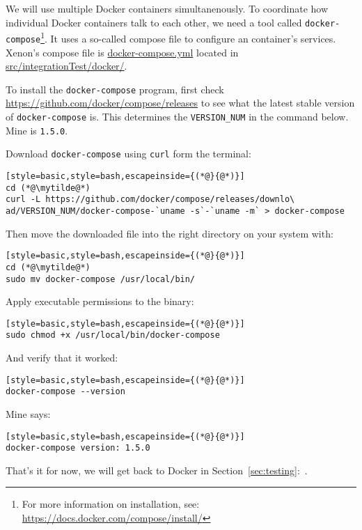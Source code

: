 We will use multiple Docker containers simultanenously. To coordinate how individual Docker containers talk to each other, we need a tool called \texttt{docker-compose}\footnote{For more information on installation, see: \url{https://docs.docker.com/compose/install/}}. It uses
a so-called compose file to configure an container's services. Xenon's compose file is \url{docker-compose.yml} located in \url{src/integrationTest/docker/}.

To install the \texttt{docker-compose} program, first check \url{https://github.com/docker/compose/releases} to see what the latest stable version of \texttt{docker-compose} is. This determines the \texttt{VERSION\_NUM} in the command below. Mine is \texttt{1.5.0}.

Download \texttt{docker-compose} using \texttt{curl} form the terminal:
\begin{lstlisting}[style=basic,style=bash,escapeinside={(*@}{@*)}]
cd (*@\mytilde@*)
curl -L https://github.com/docker/compose/releases/downlo\
ad/VERSION_NUM/docker-compose-`uname -s`-`uname -m` > docker-compose
\end{lstlisting}

Then move the downloaded file into the right directory on your system with:
\begin{lstlisting}[style=basic,style=bash,escapeinside={(*@}{@*)}]
cd (*@\mytilde@*)
sudo mv docker-compose /usr/local/bin/
\end{lstlisting}

Apply executable permissions to the binary:
\begin{lstlisting}[style=basic,style=bash,escapeinside={(*@}{@*)}]
sudo chmod +x /usr/local/bin/docker-compose
\end{lstlisting}

And verify that it worked:
\begin{lstlisting}[style=basic,style=bash,escapeinside={(*@}{@*)}]
docker-compose --version
\end{lstlisting}
Mine says:
\begin{lstlisting}[style=basic,style=bash,escapeinside={(*@}{@*)}]
docker-compose version: 1.5.0
\end{lstlisting}

That's it for now, we will get back to Docker in Section~\ref{sec:testing}:~.











